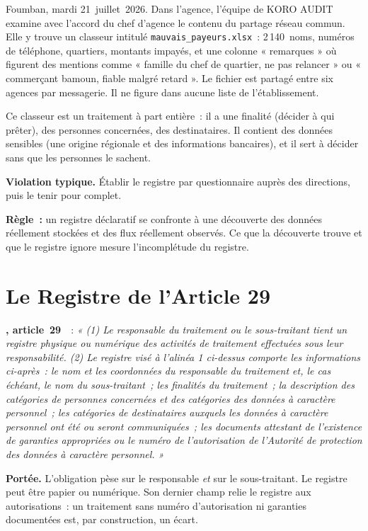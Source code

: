 Foumban, mardi 21~juillet~2026. Dans l'agence, l'équipe de KORO AUDIT
examine avec l'accord du chef d'agence le contenu du partage réseau
commun. Elle y trouve un classeur intitulé \texttt{mauvais\_payeurs.xlsx}~:
2\,140~noms, numéros de téléphone, quartiers, montants impayés, et une
colonne « remarques » où figurent des mentions comme « famille du chef de
quartier, ne pas relancer » ou « commerçant bamoun, fiable malgré
retard ». Le fichier est partagé entre six agences par messagerie. Il ne
figure dans aucune liste de l'établissement.

Ce classeur est un traitement à part entière~: il a une finalité (décider à
qui prêter), des personnes concernées, des destinataires. Il contient des
données sensibles (une origine régionale et des informations bancaires), et
il sert à décider sans que les personnes le sachent.

\begin{boxalert}
\textbf{Violation typique.} Établir le registre par questionnaire auprès des
directions, puis le tenir pour complet.

\smallskip
\textbf{Règle~:} un registre déclaratif se confronte à une découverte des
données réellement stockées et des flux réellement observés. Ce que la
découverte trouve et que le registre ignore mesure l'incomplétude du
registre.
\end{boxalert}

\section{Le Registre de l'Article 29}
\label{sec:c04-registre}

\begin{boxjuris}
\textbf{, article~29}~\cite{loi2024017}~:
\textit{« (1) Le responsable du traitement ou le sous-traitant tient un
registre physique ou numérique des activités de traitement effectuées sous
leur responsabilité. (2) Le registre visé à l'alinéa 1 ci-dessus comporte
les informations ci-après~: le nom et les coordonnées du responsable du
traitement et, le cas échéant, le nom du sous-traitant~; les finalités du
traitement~; la description des catégories de personnes concernées et des
catégories des données à caractère personnel~; les catégories de
destinataires auxquels les données à caractère personnel ont été ou seront
communiquées~; les documents attestant de l'existence de garanties
appropriées ou le numéro de l'autorisation de l'Autorité de protection des
données à caractère personnel. »}

\smallskip
\textbf{Portée.} L'obligation pèse sur le responsable \textit{et} sur le
sous-traitant. Le registre peut être papier ou numérique. Son dernier champ
relie le registre aux autorisations~: un traitement sans numéro
d'autorisation ni garanties documentées est, par construction, un écart.
\end{boxjuris}

